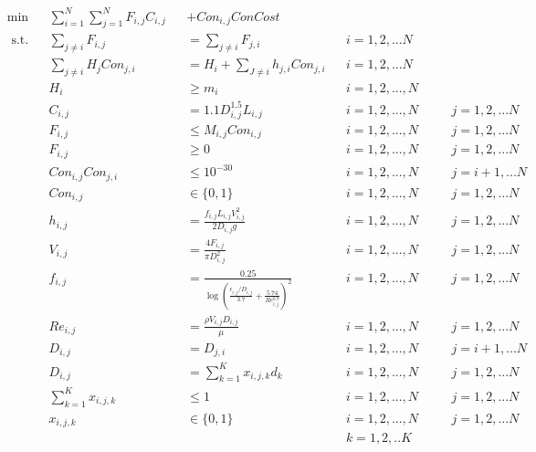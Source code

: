 \documentclass[12pt]{article}
\begin{document}
\begin{equation}
\begin{aligned}
	& \min &&\sum_{i=1}^{N}\sum_{j=1}^{N} F_{i,j} C_{i,j} &&+ Con_{i,j} ConCost\\
    & \text{ s.t.} && \sum_{j \neq i} F_{i,j} && = \sum_{j \neq i} F_{j,i} \quad && i = 1, 2, ... N\\
    & && \sum_{j \neq i} H_j Con_{j,i} && = H_i + \sum_{J \neq i} h_{j,i}Con_{j,i} && i = 1,2, ...N\\
    & && H_i && \geq m_i && i = 1, 2, ..., N \\
    & && C_{i,j} && = 1.1 D_{i,j}^{1.5} L_{i,j} && i = 1, 2, ..., N \quad && j = 1, 2, ... N\\
    & && F_{i,j} && \leq M_{i,j} Con_{i,j} && i = 1, 2, ..., N \quad && j = 1, 2, ... N\\
    & && F_{i,j} && \geq 0 && i = 1, 2, ..., N \quad && j = 1, 2, ... N\\
    & && Con_{i,j}Con_{j,i} && \leq 10^{-30} && i = 1, 2, ..., N \quad && j = i+1, ... N\\
    & && Con_{i,j} &&\in \{0,1\} && i = 1, 2, ..., N \quad && j = 1, 2, ... N\\
    & && h_{i,j} && = \frac{f_{i,j} L_{i,j} V_{i,j}^2}{2D_{i,j} g} && i = 1, 2, ..., N \quad && j = 1, 2, ... N\\
    & && V_{i,j} && = \frac{4 F_{i,j}}{\pi D_{i,j}^2} && i = 1, 2, ..., N \quad && j = 1, 2, ... N\\
    & && f_{i,j} &&= \frac{0.25}{\log\left(\frac{\epsilon_{i,j}/D_{i,j}}{3.7} + \frac{5.74}{Re_{i,j}^{0.9}}\right)^2} && i = 1, 2, ..., N \quad && j = 1, 2, ... N\\
    & && Re_{i,j} && = \frac{\rho V_{i,j} D_{i,j}}{\mu} && i = 1, 2, ..., N \quad && j = 1, 2, ... N\\
    & && D_{i,j} && = D_{j,i} && i = 1, 2, ..., N \quad && j = i+1, ... N\\
    & && D_{i,j} && = \sum_{k=1}^{K}x_{i,j,k}d_k && i = 1, 2, ..., N \quad && j = 1, 2, ... N\\
    & && \sum_{k=1}^{K} x_{i,j,k} && \leq 1 && i = 1, 2, ..., N \quad && j = 1, 2, ... N\\
    & && x_{i,j,k} && \in \{0,1\} && i = 1, 2, ..., N \quad && j = 1, 2, ... N \\
    & && && && k = 1,2, ..K\\ 
\end{aligned}
\end{equation}
\end{document}
